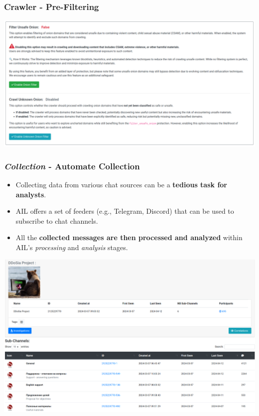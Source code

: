 \documentclass[10pt,aspectratio=169, colorlinks=true, linkcolor=circlBlue]{beamer}
\begin{document}
\begin{frame}
    \frametitle{Crawler - Pre-Filtering }
    \begin{center}
        \includegraphics[scale=0.27]{images/ail-crawler-filter.png}
    \end{center}
\end{frame}

\begin{frame}
    \frametitle{\textit{Collection} - Automate Collection}
    \begin{itemize}
        \item Collecting data from various chat sources can be a \textbf{tedious task for analysts}.
        \item AIL offers a set of feeders (e.g., Telegram, Discord) that can be used to subscribe to chat channels.
        \item All the \textbf{collected messages are then processed and analyzed} within AIL's \textit{processing} and \textit{analysis} stages.
    \end{itemize}
    \begin{center}
        \includegraphics[scale=0.18]{screenshot/chat-forum.png}
    \end{center}
\end{frame}
\end{document}
